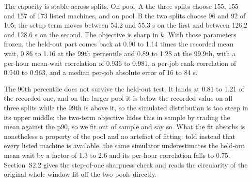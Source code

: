 \documentclass[mathematics,supfile,submit,moreauthors]{Definitions/mdpi}
\newcommand{\devnum}[1]{#1}
\begin{document}
The capacity is stable across splits. On pool~A the three splits choose \devnum{155},
\devnum{155} and \devnum{157} of \devnum{173} listed machines, and on pool~B the two
splits choose \devnum{96} and \devnum{92} of \devnum{105}; the setup term moves between
\devnum{54.2} and \devnum{55.3} s on the first and between \devnum{126.2} and
\devnum{128.6} s on the second. The objective is sharp in $k$. With those parameters
frozen, the held-out part comes
back at \devnum{0.90} to \devnum{1.14} times the recorded mean wait, \devnum{0.86} to
\devnum{1.16} at the 99th percentile and \devnum{0.89} to \devnum{1.28} at the 99.9th,
with a per-hour mean-wait correlation of \devnum{0.936} to \devnum{0.981}, a per-job rank
correlation of \devnum{0.940} to \devnum{0.963}, and a median per-job absolute error of
\devnum{16} to \devnum{84} s.

The 90th percentile does not survive the held-out test. It lands at \devnum{0.81} to
\devnum{1.21}
of the recorded one, and on the larger pool it is below the recorded value on all three
splits while the 99th is above it, so the simulated distribution is too steep in its upper
middle; the two-term objective hides this in sample by trading the mean against the p90,
so we fit out of sample and say so. What the fit absorbs is nonetheless a
property of the pool and no artefact of fitting: told instead that every listed
machine is available, the same simulator underestimates the held-out mean wait by a factor
of \devnum{1.3} to \devnum{2.6} and its per-hour correlation falls to \devnum{0.75}.
Section~S2.2 gives the step-of-one sharpness check and reads the circularity
of the original whole-window fit off the two pools directly.
\end{document}
